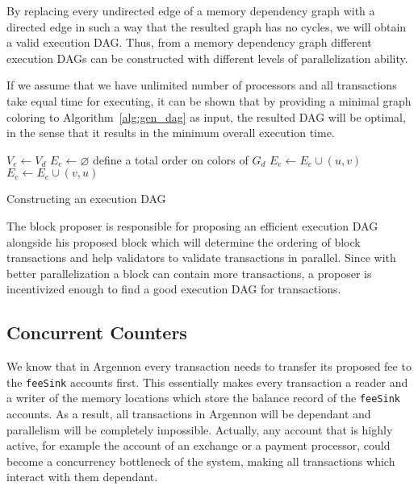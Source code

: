 \documentclass[11pt, A4]{report}
\begin{document}
    By replacing every undirected edge of a memory dependency graph with a directed edge in such a way that the
    resulted graph has no cycles, we will obtain a valid execution DAG. Thus, from a memory dependency graph different
    execution DAGs can be constructed with different levels of parallelization ability.

    If we assume that we have unlimited number of processors and all transactions take equal time for executing, it
    can be shown that by providing a minimal graph coloring to Algorithm~\ref{alg:gen_dag} as input, the resulted
    DAG will be optimal, in the sense that it results in the minimum overall execution time.

    \begin{algorithm}
        \DontPrintSemicolon
        \BlankLine
        $V_e \gets V_d$\;
        $E_e \gets \varnothing$\;
        define a total order on colors of $G_d$\;
        {
            {
                $E_e \gets E_e \cup (u,v)$\;
            }{
                $E_e \gets E_e \cup (v,u)$\;
            }
        }
        \caption{Constructing an execution DAG}\label{alg:gen_dag}
    \end{algorithm}

    The block proposer is responsible for proposing an efficient execution DAG alongside his proposed block which will
    determine the ordering of block transactions and help validators to validate transactions in parallel. Since with
    better parallelization a block can contain more transactions, a proposer is incentivized enough to find a good
    execution DAG for transactions.


 \subsection{Concurrent Counters}\label{subsec:concurrent-counters}

    We know that in Argennon every transaction needs to transfer its proposed fee to the \texttt{feeSink} accounts
    first. This essentially makes every transaction a reader and a writer of the memory locations which store the
    balance record of the \texttt{feeSink} accounts. As a result, all transactions in Argennon will be dependant and
    parallelism will be completely impossible. Actually, any account that is highly active, for example the account
    of an exchange or a payment processor, could become a concurrency bottleneck of the system, making all transactions
    which interact with them dependant.
\end{document}

